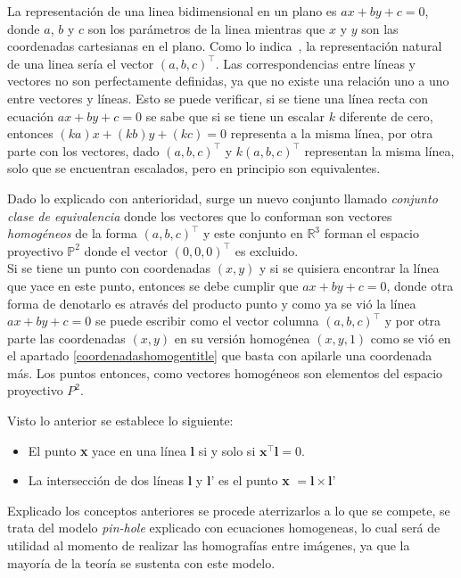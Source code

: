 La representación de una linea bidimensional en un plano es $ax+by+c=0$, donde $a$, $b$ y $c$ son los parámetros de la linea mientras que $x$ y $y$ son las coordenadas cartesianas en el plano. Como lo indica~\cite{hartley_zisserman_2004}, la representación natural de una linea sería el vector $(a,b,c)^\top$. 
Las correspondencias entre líneas y vectores no son perfectamente definidas, ya que no existe una relación uno a uno entre vectores y líneas. Esto se puede verificar, si se tiene una línea recta con ecuación $ax+by+c=0$ se sabe que si se tiene un escalar $k$ diferente de cero, entonces $(ka)x + (kb)y + (kc) = 0$ representa a la misma línea, por otra parte con los vectores, dado $(a,b,c)^\top$ y $k(a,b,c)^\top$ representan la misma línea, solo que se encuentran escalados, pero en principio son equivalentes.

Dado lo explicado con anterioridad, surge un nuevo conjunto llamado \emph{conjunto clase de equivalencia} donde los vectores que lo conforman son vectores \emph{homogéneos} de la forma  $(a,b,c)^\top$ y este conjunto en $\mathbb{R}^3$  forman el espacio proyectivo $\mathbb{P}^2$ donde el vector $(0,0,0)^\top$ es excluido.
\\
Si se tiene un punto con coordenadas $(x,y)$ y si se quisiera encontrar la línea  que yace en este punto, entonces se debe cumplir que $ax+by+c=0$, donde otra forma de denotarlo es através del producto punto y como ya se vió la línea $ax+by+c=0$ se puede escribir como el vector columna $(a,b,c)^\top$ y por otra parte las coordenadas $(x,y)$ en su versión homogénea $(x,y,1)$ como se vió en el apartado \ref{coordenadashomogentitle} que basta con apilarle una coordenada más. Los puntos entonces, como vectores homogéneos son elementos del espacio proyectivo $P^2$.

Visto lo anterior se establece lo siguiente:

\begin{itemize}
    \item El punto \textbf{x} yace en una línea \textbf{l} si y solo si $\textbf{x}^\top \textbf{l} = 0$.
    
    \item La intersección de dos líneas $\textbf{l}$ y $\textbf{l'}$ es el punto \textbf{x} $= \textbf{l} \times \textbf{l'}$
\end{itemize}

Explicado los conceptos anteriores se procede aterrizarlos a lo que se compete, se trata del modelo \emph{pin-hole} explicado con ecuaciones homogeneas, lo cual será de utilidad al momento de realizar las homografías entre imágenes, ya que la mayoría de la teoría se sustenta con este modelo.

